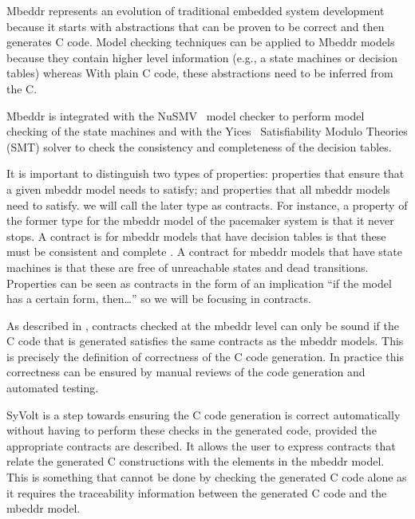 Mbeddr represents an evolution of traditional embedded system development because it starts with abstractions that can be proven to be correct and then generates C code. Model checking techniques can be applied to Mbeddr models because they contain higher level information (e.g., a state machines or decision tables) whereas With plain C code, these abstractions need to be inferred from the C.

Mbeddr is integrated with the NuSMV~\cite{Cimatti2002} model checker to perform model checking of the state machines and with the Yices~\cite{Dutertre:cav2014} Satisfiability Modulo Theories (SMT) solver to check the consistency and completeness of the decision tables.

It is important to distinguish two types of properties: properties that ensure that a given mbeddr model needs to satisfy; and properties that all mbeddr models need to satisfy. we will call the later type as contracts.
For instance, a property of the former type for the mbeddr model of the pacemaker system is that it never stops. A contract is for mbeddr models that have decision tables is that these must be consistent and complete \cite{Ratiu:2012:LEE:2663689.2663692}. A contract for mbeddr models that have state machines is that these are free of unreachable states and dead transitions.
Properties can be seen as contracts in the form of an implication ``if the model has a certain form, then\ldots'' so we will be focusing in contracts.

As described in \cite{Ratiu:2012:LEE:2663689.2663692}, contracts checked at the mbeddr level can only be sound if the C code that is generated satisfies the same contracts as the mbeddr models. 
This is precisely the definition of correctness of the C code generation. 
In practice this correctness can be ensured by manual reviews of the code generation and automated testing.

SyVolt is a step towards ensuring the C code generation is correct automatically without having to perform these checks in the generated code, provided the appropriate contracts are described.
It allows the user to express contracts that relate the generated C constructions with the elements in the mbeddr model.
This is something that cannot be done by checking the generated C code alone as it requires the traceability information between the generated C code and the mbeddr model.

